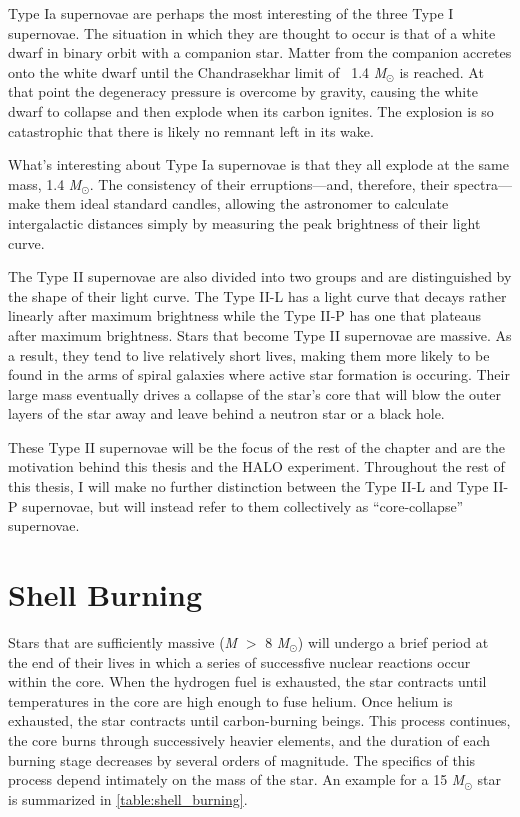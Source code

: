 		Type Ia supernovae are perhaps the most interesting of the three Type I supernovae. The situation in which they are thought to occur is that of a white dwarf in binary orbit with a companion star. Matter from the companion accretes onto the white dwarf until the Chandrasekhar limit of \ 1.4 \emph{M}$_\odot$ is reached. At that point the degeneracy pressure is overcome by gravity, causing the white dwarf to collapse and then explode when its carbon ignites. The explosion is so catastrophic that there is likely no remnant left in its wake. 

		What's interesting about Type Ia supernovae is that they all explode at the same mass, 1.4 \emph{M}$_\odot$. The consistency of their erruptions---and, therefore, their spectra---make them ideal standard candles, allowing the astronomer to calculate intergalactic distances simply by measuring the peak brightness of their light curve.

		The Type II supernovae are also divided into two groups and are distinguished by the shape of their light curve. The Type II-L has a light curve that decays rather linearly after maximum brightness while the Type II-P has one that plateaus after maximum brightness. Stars that become Type II supernovae are massive. As a result, they tend to live relatively short lives, making them more likely to be found in the arms of spiral galaxies where active star formation is occuring. Their large mass eventually drives a collapse of the star's core that will blow the outer layers of the star away and leave behind a neutron star or a black hole.

		These Type II supernovae will be the focus of the rest of the chapter and are the motivation behind this thesis and the HALO experiment. Throughout the rest of this thesis, I will make no further distinction between the Type II-L and Type II-P supernovae, but will instead refer to them collectively as ``core-collapse'' supernovae.
	\section{Shell Burning}
		Stars that are sufficiently massive (\emph{M} $>$ 8 \emph{M}$_\odot$) will undergo a brief period at the end of their lives in which a series of successfive nuclear reactions occur within the core. When the hydrogen fuel is exhausted, the star contracts until temperatures in the core are high enough to fuse helium. Once helium is exhausted, the star contracts until carbon-burning beings. This process continues, the core burns through successively heavier elements, and the duration of each burning stage decreases by several orders of magnitude. The specifics of this process depend intimately on the mass of the star. An example for a 15 \emph{M}$_\odot$ star is summarized in \TAB \ref{table:shell_burning}.

